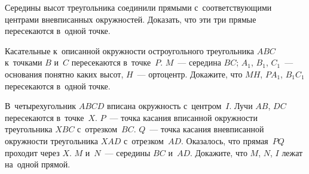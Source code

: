 \begin{problems}
\item
Середины высот треугольника соединили прямыми с~соответствующими центрами
вневписанных окружностей.
Доказать, что эти три прямые пересекаются в~одной точке.

\item
Касательные к~описанной окружности остроугольного треугольника $ABC$ к~точками
$B$ и~$C$ пересекаются в~точке~$P$.
$M$~— середина $BC$;
$A_1$, $B_1$, $C_1$~— основания понятно каких высот, $H$~— ортоцентр.
Докажите, что $MH$, $P A_1$, $B_1 C_1$ пересекаются в~одной точке.

\item
В~четырехугольник $ABCD$ вписана окружность с~центром~$I$.
Лучи $AB$, $DC$ пересекаются в~точке~$X$.
$P$~— точка касания вписанной окружности треугольника $XBC$ с~отрезком~$BC$.
$Q$~— точка касания вневписанной окружности треугольника $XAD$
с~отрезком~$AD$.
Оказалось, что прямая~$PQ$ проходит через $X$.
$M$ и~$N$~— середины $BC$ и~$AD$.
Докажите, что $M$, $N$, $I$ лежат на~одной прямой.

\end{problems}

